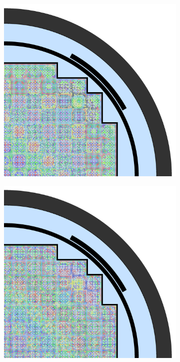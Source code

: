 \begin{figure}[h!]
\begin{subfigure}{0.48\textwidth}
  \caption{}
  \label{fig:chap10-full-core-pinch-32}
\end{subfigure}%
\begin{subfigure}{0.48\textwidth}
  \centering
  \includegraphics[width=0.9\linewidth]{figures/unsupervised/geometries/with-features/32-clusters/combined/full-core}
  \caption{}
  \label{fig:chap10-full-core-combined-32}
\end{subfigure}
\begin{subfigure}{0.48\textwidth}
  \centering
  \includegraphics[width=0.9\linewidth]{figures/unsupervised/geometries/with-features/64-clusters/pinch/full-core}

\end{subfigure}
\end{figure}
